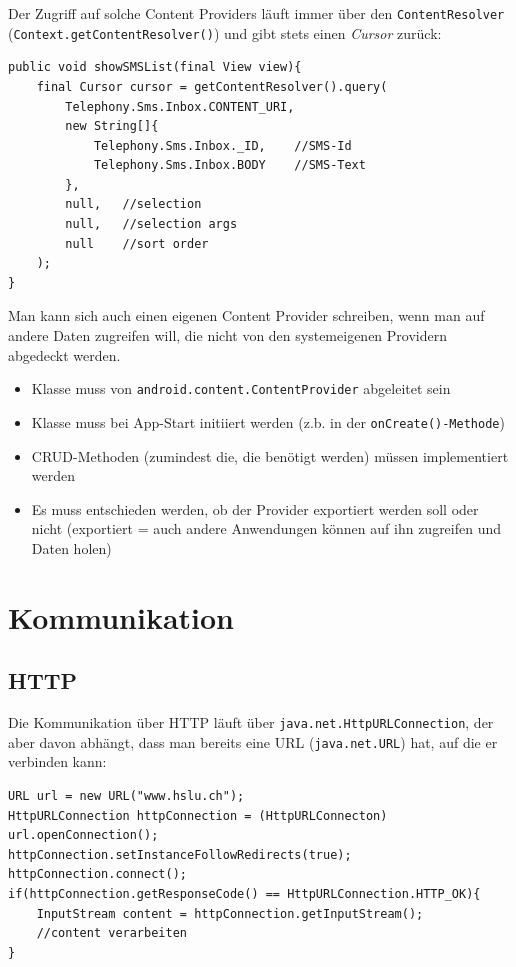\documentclass[a4paper, 11pt]{article}
\newcommand{\code}[1]{\texttt{#1}}
\begin{document}
Der Zugriff auf solche Content Providers läuft immer über den \code{ContentResolver} \\ (\code{Context.getContentResolver()}) und gibt stets einen \textit{Cursor} zurück:

\begin{lstlisting}[caption={Auslesen aller SMS mittels Content Provider}]
public void showSMSList(final View view){
	final Cursor cursor = getContentResolver().query(
		Telephony.Sms.Inbox.CONTENT_URI,
		new String[]{
			Telephony.Sms.Inbox._ID,	//SMS-Id
			Telephony.Sms.Inbox.BODY	//SMS-Text
		},
		null,	//selection
		null,	//selection args
		null	//sort order
	);
}
\end{lstlisting}
\vspace{10px}

\noindent Man kann sich auch einen eigenen Content Provider schreiben, wenn man auf andere Daten zugreifen will, die nicht von den systemeigenen Providern abgedeckt werden. 

\begin{itemize}
	\item Klasse muss von \code{android.content.ContentProvider} abgeleitet sein
	\item Klasse muss bei App-Start initiiert werden (z.b. in der \code{onCreate()-Methode})
	\item CRUD-Methoden (zumindest die, die benötigt werden) müssen implementiert werden
	\item Es muss entschieden werden, ob der Provider exportiert werden soll oder nicht (exportiert = auch andere Anwendungen können auf ihn zugreifen und Daten holen)
\end{itemize}


\section{Kommunikation}
\subsection{HTTP}
Die Kommunikation über HTTP läuft über \code{java.net.HttpURLConnection}, der aber davon abhängt, dass man bereits eine URL (\code{java.net.URL}) hat, auf die er verbinden kann:

\begin{lstlisting}[caption={}]
URL url = new URL("www.hslu.ch");
HttpURLConnection httpConnection = (HttpURLConnecton) url.openConnection();
httpConnection.setInstanceFollowRedirects(true);
httpConnection.connect();
if(httpConnection.getResponseCode() == HttpURLConnection.HTTP_OK){
	InputStream content = httpConnection.getInputStream();
	//content verarbeiten
}
\end{lstlisting}
\end{document}
